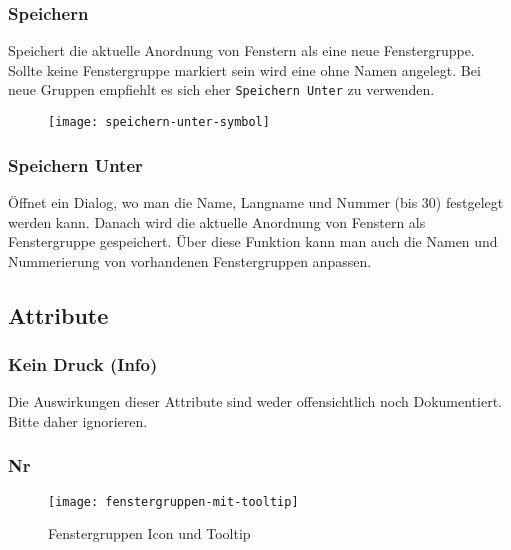 \subsubsection{Speichern}

\vspace{10pt}

Speichert die aktuelle Anordnung von Fenstern als eine neue Fenstergruppe. Sollte keine Fenstergruppe markiert sein wird eine ohne Namen angelegt. Bei neue Gruppen empfiehlt es sich eher \texttt{Speichern Unter} zu verwenden.\\

\begin{wrapfigure}{r}{.05\textwidth}
	\vspace{-14pt}
	\texttt{[image: speichern-unter-symbol]}
	\vspace{-35pt}
\end{wrapfigure}

\subsubsection{Speichern Unter}

\vspace{10pt}

Öffnet ein Dialog, wo man die Name, Langname und Nummer (bis 30) festgelegt werden kann. Danach wird die aktuelle Anordnung von Fenstern als Fenstergruppe gespeichert. Über diese Funktion kann man auch die Namen und Nummerierung von vorhandenen Fenstergruppen anpassen.\\

\subsection{Attribute}

\subsubsection{Kein Druck (Info)}

Die Auswirkungen dieser Attribute sind weder offensichtlich noch Dokumentiert. Bitte daher ignorieren.

\subsubsection{Nr}

\begin{wrapfigure}{r}{.4\textwidth}
	\vspace{-14pt}
	\texttt{[image: fenstergruppen-mit-tooltip]}
	\vspace{-5pt}
	\caption{Fenstergruppen Icon und Tooltip}
	\label{fig:fenstergruppen-mit-tooltip}
	\vspace{-24pt}
\end{wrapfigure}

